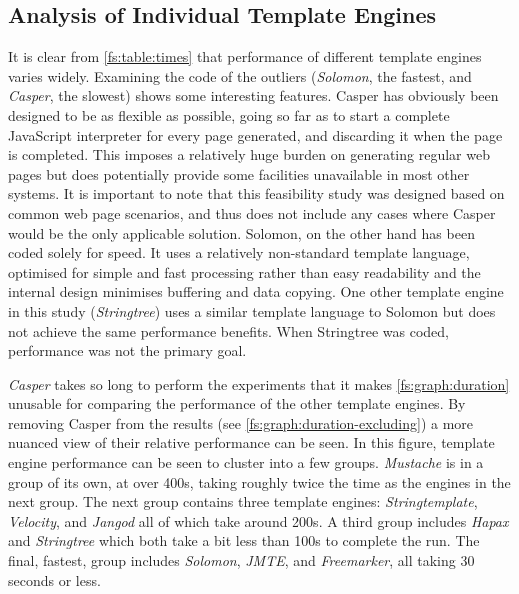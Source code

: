 \subsection{Analysis of Individual Template Engines}

It is clear from \autoref{fs:table:times} that performance of different template engines varies widely. Examining the code of the outliers (\emph{Solomon}, the fastest, and \emph{Casper}, the slowest) shows some interesting features. Casper has obviously been designed to be as flexible as possible, going so far as to start a complete JavaScript interpreter for every page generated, and discarding it when the page is completed. This imposes a relatively huge burden on generating regular web pages but does potentially provide some facilities unavailable in most other systems. It is important to note that this feasibility study was designed based on common web page scenarios, and thus does not include any cases where Casper would be the only applicable solution. Solomon, on the other hand has been coded solely for speed. It uses a relatively non-standard template language, optimised for simple and fast processing rather than easy readability and the internal design minimises buffering and data copying. One other template engine in this study (\emph{Stringtree}) uses a similar template language to Solomon but does not achieve the same performance benefits. When Stringtree was coded, performance was not the primary goal.

\emph{Casper} takes so long to perform the experiments that it makes \autoref{fs:graph:duration} unusable for comparing the performance of the other template engines. By removing Casper from the results (see \autoref{fs:graph:duration-excluding}) a more nuanced view of their relative performance can be seen. In this figure, template engine performance can be seen to cluster into a few groups. \emph{Mustache} is in a group of its own, at over 400s, taking roughly twice the time as the engines in the next group. The next group contains three template engines: \emph{Stringtemplate}, \emph{Velocity}, and \emph{Jangod} all of which take around 200s. A third group includes \emph{Hapax} and \emph{Stringtree} which both take a bit less than 100s to complete the run. The final, fastest, group includes \emph{Solomon}, \emph{JMTE}, and \emph{Freemarker}, all taking 30 seconds or less.

